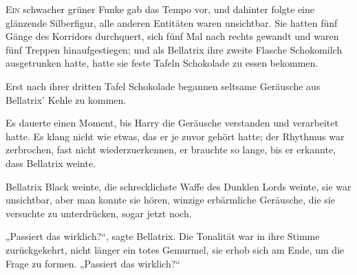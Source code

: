 
\lettrine{E}{in} schwacher grüner Funke gab das Tempo vor, und dahinter folgte eine glänzende Silberfigur, alle anderen Entitäten waren unsichtbar. Sie hatten fünf Gänge des Korridors durchquert, sich fünf Mal nach rechts gewandt und waren fünf Treppen hinaufgestiegen; und als Bellatrix ihre zweite Flasche Schokomilch ausgetrunken hatte, hatte sie feste Tafeln Schokolade zu essen bekommen.

Erst nach ihrer dritten Tafel Schokolade begannen seltsame Geräusche aus Bellatrix’ Kehle zu kommen.

Es dauerte einen Moment, bis Harry die Geräusche verstanden und verarbeitet hatte. Es klang nicht wie etwas, das er je zuvor gehört hatte; der Rhythmus war zerbrochen, fast nicht wiederzuerkennen, er brauchte so lange, bis er erkannte, dass Bellatrix weinte.

Bellatrix Black weinte, die schrecklichste Waffe des Dunklen Lords weinte, sie war unsichtbar, aber man konnte sie hören, winzige erbärmliche Geräusche, die sie versuchte zu unterdrücken, sogar jetzt noch.

„Passiert das wirklich?“, sagte Bellatrix. Die Tonalität war in ihre Stimme zurückgekehrt, nicht länger ein totes Gemurmel, sie erhob sich am Ende, um die Frage zu formen.
„Passiert das wirklich?“

